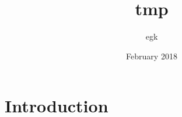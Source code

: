 \documentclass{article}
\title{tmp}
\author{egk }
\date{February 2018}
\begin{document}
\maketitle

\section{Introduction}
\end{document}
